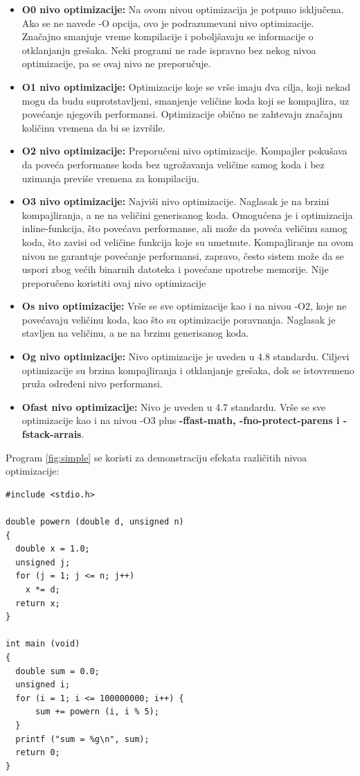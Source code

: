 \documentclass[a4paper]{article}
\begin{document}
\begin{itemize}
\item \textbf{O0 nivo optimizacije:} Na ovom nivou optimizacija je potpuno isključena. Ako se ne navede -O opcija, ovo je podrazumevani nivo optimizacije. Značajno smanjuje vreme kompilacije i poboljšavaju se informacije o otklanjanju grešaka. Neki programi ne rade ispravno bez nekog nivoa optimizacije, pa se ovaj nivo ne preporučuje.
\item \textbf{O1 nivo optimizacije:} Optimizacije koje se vrše imaju dva cilja, koji nekad mogu da budu suprotstavljeni, smanjenje veličine koda koji se kompajlira, uz povećanje njegovih performansi. Optimizacije obično ne zahtevaju značajnu količinu vremena da bi se izvršile.
\item \textbf{O2 nivo optimizacije:} Preporučeni nivo optimizacije. Kompajler pokušava da poveća performanse koda bez ugrožavanja veličine samog koda i bez uzimanja previše vremena za kompilaciju.
\item \textbf{O3 nivo optimizacije:} Najviši nivo optimizacije. Naglasak je na brzini kompajliranja, a ne na veličini generisanog koda. Omogućena je i optimizacija inline-funkcija, što povećava performanse, ali može da poveća veličinu samog koda, što zavisi od veličine funkcija koje su umetnute. Kompajliranje na ovom nivou ne garantuje povećanje performansi, zapravo, često sistem može da se uspori zbog većih binarnih datoteka i povećane upotrebe memorije. Nije preporučeno koristiti ovaj nivo optimizacije
\item \textbf{Os nivo optimizacije:} Vrše se sve optimizacije kao i na nivou -O2, koje ne povećavaju veličinu koda, kao što su optimizacije poravnanja. Naglasak je stavljen na veličinu, a ne na brzinu generisanog koda.
\item \textbf{Og nivo optimizacije:} Nivo optimizacije je uveden u 4.8 standardu. Ciljevi optimizacije su brzina kompajliranja i otklanjanje grešaka, dok se istovremeno pruža određeni nivo performansi.
\item \textbf{Ofast nivo optimizacije:} Nivo je uveden u 4.7 standardu. Vrše se sve optimizacije kao i na nivou -O3 plus \textbf{-ffast-math, -fno-protect-parens i -fstack-arrais}. \cite{gccOptions}
\end{itemize}

Program \ref{fig:simple} se koristi za demonstraciju efekata različitih nivoa optimizacije:

\begin{lstlisting}[caption={Program za izračunavanje n-tog stepena brojeva},frame=single, label={fig:simple}]
#include <stdio.h>

double powern (double d, unsigned n)
{
  double x = 1.0;
  unsigned j;
  for (j = 1; j <= n; j++)
    x *= d;
  return x;
}

int main (void)
{
  double sum = 0.0;
  unsigned i;
  for (i = 1; i <= 100000000; i++) {
      sum += powern (i, i % 5);
  }
  printf ("sum = %g\n", sum);
  return 0;
}
\end{lstlisting}
\end{document}
